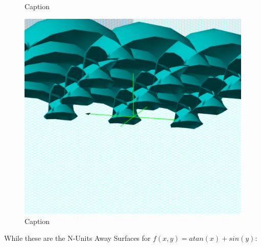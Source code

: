 \begin{figure}[H]
\begin{minipage}[b]{0.3\linewidth}
    \caption{Caption} 
    \label{fig:fig42}
    \vspace{4ex}
  \end{minipage} %
  \begin{minipage}[b]{0.3\linewidth}
    \centering
    \includegraphics[width=.9\linewidth]{surfaces-img/Fig 43.png} 
    \caption{Caption} 
    \label{fig:fig43}
    \vspace{4ex}
  \end{minipage} %
\end{figure}

While these are the N-Units Away Surfaces for $f(x,y) = atan(x) + sin(y)$:

